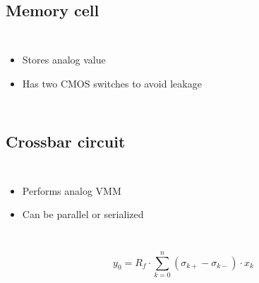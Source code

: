 \documentclass[14pt]{beamer}
\begin{document}
\subsection{Memory cell}

\begin{frame}{\insertsection}{\insertsubsection}
  \begin{columns}
    
    \begin{itemize}
      \item Stores analog value
      \item Has two CMOS switches to avoid leakage
    \end{itemize}
  \end{columns}
\end{frame}

\begin{frame}{\insertsection}{\insertsubsection}
  \begin{center}
    
  \end{center}
\end{frame}

\subsection{Crossbar circuit}

\begin{frame}{\insertsection}{\insertsubsection}
  \begin{columns}
    \begin{itemize}
      \item Performs analog VMM
      \item Can be parallel or serialized
    \end{itemize}
    
  \end{columns}
\end{frame}

\begin{frame}{\insertsection}{\insertsubsection}
  
  \begin{equation}
    \label{eq:doubleMem2}
    y_0=R_f\cdot\sum_{k=0}^n(\sigma_{k+}-\sigma_{k-})\cdot x_k
  \end{equation}
\end{frame}
\end{document}
